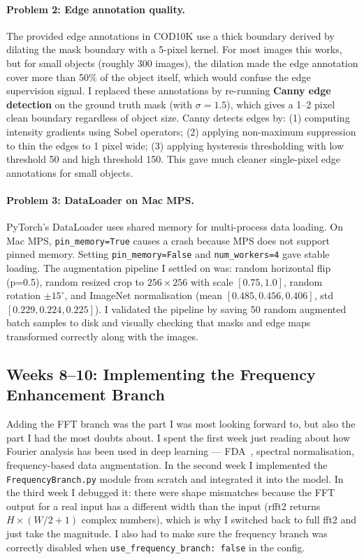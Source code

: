 \documentclass[12pt,a4paper]{report}
\begin{document}
\paragraph{Problem 2: Edge annotation quality.}
The provided edge annotations in COD10K use a thick boundary derived by dilating the mask boundary with a 5-pixel kernel. For most images this works, but for small objects (roughly 300 images), the dilation made the edge annotation cover more than 50\% of the object itself, which would confuse the edge supervision signal. I replaced these annotations by re-running \textbf{Canny edge detection} on the ground truth mask (with $\sigma = 1.5$), which gives a 1--2 pixel clean boundary regardless of object size. Canny detects edges by: (1) computing intensity gradients using Sobel operators; (2) applying non-maximum suppression to thin the edges to 1 pixel wide; (3) applying hysteresis thresholding with low threshold 50 and high threshold 150. This gave much cleaner single-pixel edge annotations for small objects.

\paragraph{Problem 3: DataLoader on Mac MPS.}
PyTorch's DataLoader uses shared memory for multi-process data loading. On Mac MPS, \texttt{pin\_memory=True} causes a crash because MPS does not support pinned memory. Setting \texttt{pin\_memory=False} and \texttt{num\_workers=4} gave stable loading. The augmentation pipeline I settled on was: random horizontal flip (p=0.5), random resized crop to $256\times256$ with scale $[0.75, 1.0]$, random rotation $\pm15^\circ$, and ImageNet normalisation (mean $[0.485, 0.456, 0.406]$, std $[0.229, 0.224, 0.225]$). I validated the pipeline by saving 50 random augmented batch samples to disk and visually checking that masks and edge maps transformed correctly along with the images.

\subsection*{Weeks 8--10: Implementing the Frequency Enhancement Branch}

Adding the FFT branch was the part I was most looking forward to, but also the part I had the most doubts about. I spent the first week just reading about how Fourier analysis has been used in deep learning — FDA~\cite{yang2020fda}, spectral normalisation, frequency-based data augmentation. In the second week I implemented the \texttt{FrequencyBranch.py} module from scratch and integrated it into the model. In the third week I debugged it: there were shape mismatches because the FFT output for a real input has a different width than the input (rfft2 returns $H \times (W/2+1)$ complex numbers), which is why I switched back to full fft2 and just take the magnitude. I also had to make sure the frequency branch was correctly disabled when \texttt{use\_frequency\_branch: false} in the config.
\end{document}
